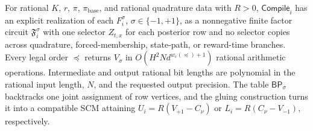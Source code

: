 For rational \(K\), \(r\), \(\pi\), \(\pi_{\mathrm{base}}\), and rational quadrature data with \(R>0\), \(\mathsf{Compile}_i\) has an explicit realization of each \(F_i^\sigma\), \(\sigma\in\{-1,+1\}\), as a nonnegative finite factor circuit \(\mathfrak F_i^\sigma\) with one selector \(Z_{t,x}\) for each posterior row and no selector copies across quadrature, forced-membership, state-path, or reward-time branches.  Every legal order \(\preceq\) returns \(V_\sigma\) in \(O(H^2N d^{w_{\mathrm c}(\preceq)+1})\) rational arithmetic operations.  Intermediate and output rational bit lengths are polynomial in the rational input length, \(N\), and the requested output precision.  The table \(\mathsf{BP}_\sigma\) backtracks one joint assignment of row vertices, and the gluing construction turns it into a compatible SCM attaining \(U_i=R(V_{+1}-C_\nu)\) or \(L_i=R(C_\nu-V_{-1})\), respectively.